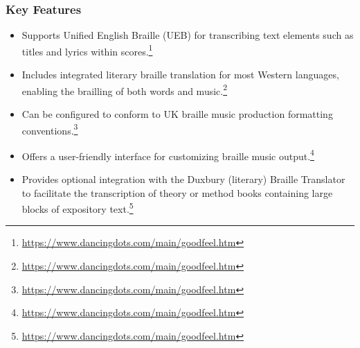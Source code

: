\subsubsection{Key Features}
\begin{itemize}
    \item Supports Unified English Braille (UEB) for transcribing text elements such as titles and lyrics within scores.\footnote{\url{https://www.dancingdots.com/main/goodfeel.htm}}
    \item Includes integrated literary braille translation for most Western languages, enabling the brailling of both words and music.\footnote{\url{https://www.dancingdots.com/main/goodfeel.htm}}
    \item Can be configured to conform to UK braille music production formatting conventions.\footnote{\url{https://www.dancingdots.com/main/goodfeel.htm}}
    \item Offers a user-friendly interface for customizing braille music output.\footnote{\url{https://www.dancingdots.com/main/goodfeel.htm}}
    \item Provides optional integration with the Duxbury (literary) Braille Translator to facilitate the transcription of theory or method books containing large blocks of expository text.\footnote{\url{https://www.dancingdots.com/main/goodfeel.htm}}
\end{itemize}

